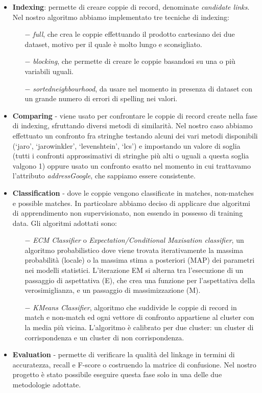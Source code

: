 \documentclass[a4paper,12pt]{article}
\begin{document}
\begin{itemize}
\item \textbf{Indexing}: permette di creare coppie di record, denominate \textit{candidate links}. Nel nostro algoritmo abbiamo implementato tre tecniche di indexing:
\begin{itemize}
	\item[$-$] \textit{full}, che crea le coppie effettuando il prodotto cartesiano dei due dataset, motivo per il quale è molto lungo e sconsigliato.
	\item[$-$] \textit{blocking}, che permette di creare le coppie basandosi su una o più variabili uguali.
	\item[$-$] \textit{sortedneighbourhood}, da usare nel momento in presenza di dataset con un grande numero di errori di spelling nei valori.
\end{itemize}
\item \textbf{Comparing} - viene usato per confrontare le coppie di record create nella fase di indexing, sfruttando diversi metodi di similarità. Nel nostro caso abbiamo effettuato un confronto fra stringhe testando alcuni dei vari metodi disponibili (‘jaro’, ‘jarowinkler’, ‘levenshtein’, ‘lcs’) e impostando un valore di soglia (tutti i confronti approssimativi di stringhe più alti o uguali a questa soglia valgono 1) oppure usato un confronto esatto nel momento in cui trattavamo l'attributo \textit{addressGoogle}, che sappiamo essere consistente.
\item \textbf{Classification} - dove le coppie vengono classificate in matches, non-matches e possible matches. In particolare abbiamo deciso di applicare due algoritmi di apprendimento non supervisionato, non essendo in possesso di training data. Gli algoritmi adottati sono:
\begin{itemize}
	\item[$-$] \textit{ECM Classifier} o \textit{Expectation/Conditional Maxisation classifier}, un algoritmo probabilistico dove viene trovata iterativamente la massima probabilità (locale) o la massima stima a posteriori (MAP) dei parametri nei modelli statistici. L'iterazione EM si alterna tra l'esecuzione di un passaggio di aspettativa (E), che crea una funzione per l'aspettativa della verosimiglianza, e un passaggio di massimizzazione (M).
	\item[$-$] \textit{KMeans Classifier}, algoritmo che suddivide le coppie di record in match e non-match ed ogni vettore di confronto appartiene al cluster con la media più vicina. L'algoritmo è calibrato per due cluster: un cluster di corrispondenza e un cluster di non corrispondenza.
\end{itemize}
\item \textbf{Evaluation} - permette di verificare la qualità del linkage in termini di accuratezza, recall e F-score o costruendo la matrice di confusione. Nel nostro progetto è stato possibile eseguire questa fase solo in una delle due metodologie adottate.
\end{itemize}
\end{document}
